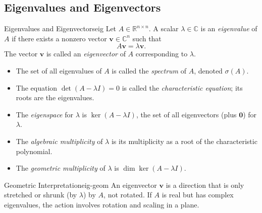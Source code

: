 \subsection{Eigenvalues and Eigenvectors}

\begin{definition}{Eigenvalues and Eigenvectors}{eig}
    Let \(A \in \mathbb{R}^{n \times n}\). A scalar \(\lambda \in \mathbb{C}\) is an \emph{eigenvalue} of \(A\) if there exists a nonzero vector \(\mathbf{v} \in \mathbb{C}^n\) such that
    \[
        A\mathbf{v} = \lambda\mathbf{v}.
    \]
    The vector \(\mathbf{v}\) is called an \emph{eigenvector} of \(A\) corresponding to \(\lambda\).
\end{definition}

\begin{itemize}[nosep]
    \item The set of all eigenvalues of \(A\) is called the \emph{spectrum} of \(A\), denoted \(\sigma(A)\).
    \item The equation \(\det(A - \lambda I) = 0\) is called the \emph{characteristic equation}; its roots are the eigenvalues.
    \item The \emph{eigenspace} for \(\lambda\) is \(\ker(A - \lambda I)\), the set of all eigenvectors (plus \(\mathbf{0}\)) for \(\lambda\).
    \item The \emph{algebraic multiplicity} of \(\lambda\) is its multiplicity as a root of the characteristic polynomial.
    \item The \emph{geometric multiplicity} of \(\lambda\) is \(\dim\ker(A - \lambda I)\).
\end{itemize}

\begin{remark}{Geometric Interpretation}{eig-geom}
    An eigenvector \(\mathbf{v}\) is a direction that is only stretched or shrunk (by \(\lambda\)) by \(A\), not rotated. If \(A\) is real but has complex eigenvalues, the action involves rotation and scaling in a plane.
\end{remark}

